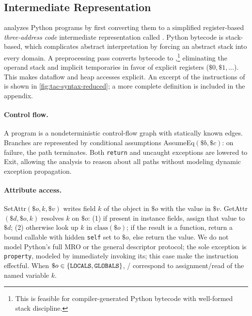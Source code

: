 \subsection{Intermediate Representation}
\spyte analyzes Python programs by first converting them to a simplified
register-based \emph{three-address code} intermediate representation called \spytecode. 
Python bytecode is stack-based, which complicates
abstract interpretation by forcing an abstract stack into every domain. A preprocessing
pass converts bytecode to \spytecode,\footnote{This is feasible for compiler-generated Python bytecode with well-formed stack discipline.}
eliminating the operand stack and implicit temporaries in favor of explicit registers
($\$0, \$1, \ldots$). This makes dataflow and heap accesses explicit.
An excerpt of the instructions of \spytecode is shown in \autoref{fig:tac-syntax-reduced}; a more complete
definition is included in the appendix.

\paragraph{Control flow.}
A \spytecode program is a nondeterministic control-flow graph with statically known edges.
Branches are represented by conditional assumptions \textsf{AssumeEq}$(\$b, \$c)$:
on failure, the path terminates. Both \texttt{return} and uncaught exceptions
are lowered to \textsf{Exit}, allowing the analysis to reason about all paths
without modeling dynamic exception propagation.

\paragraph{Attribute access.}
\textsf{SetAttr}$(\$o, k, \$v)$ writes field $k$ of the object in $\$o$ with the value in $\$v$.
\textsf{GetAttr}$(\$d, \$o, k)$ resolves $k$ on $\$o$:
(1) if present in instance fields, assign that value to $\$d$;
(2) otherwise look up $k$ in $\mathrm{class}(\$o)$; if the result is a function, return
a bound callable with hidden \texttt{self} set to $\$o$, else return the value.
We do not model Python's full MRO or the general descriptor protocol; the sole
exception is \texttt{property}, modeled by immediately invoking its; this case make the instruction effectful.
When $\$o \in \{\texttt{LOCALS}, \texttt{GLOBALS}\}$, \tSetAttr/\tGetAttr
correspond to assignment/read of the named variable $k$.

